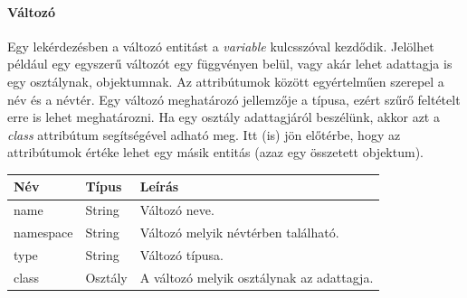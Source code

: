 \documentclass[a4paper,12pt]{report}
\begin{document}
\paragraph{Változó}
Egy lekérdezésben a változó entitást a \textit{variable} kulcsszóval kezdődik. Jelölhet például egy egyszerű változót egy függvényen belül, vagy akár lehet adattagja is egy osztálynak, objektumnak. Az attribútumok között egyértelműen szerepel a név és a névtér. Egy változó meghatározó jellemzője a típusa, ezért szűrő feltételt erre is lehet meghatározni. Ha egy osztály adattagjáról beszélünk, akkor azt a \textit{class} attribútum segítségével adható meg. Itt (is) jön előtérbe, hogy az attribútumok értéke lehet egy másik entitás (azaz egy összetett objektum).
\begin{center}
	\begin{tabular}{| l | l | l |}
		\hline
		Név & Típus & Leírás \\ \hline
		name & String & Változó neve. \\ \hline
		namespace & String & Változó melyik névtérben található. \\ \hline
		type & String & Változó típusa. \\ \hline
		class & Osztály & A változó melyik osztálynak az adattagja. \\ \hline
	\end{tabular}
\end{center}
\end{document}
